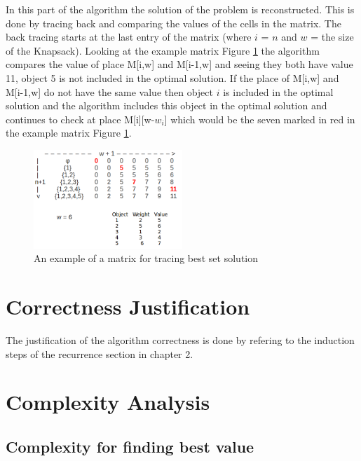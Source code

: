 \documentclass{inc/mas}
\begin{document}
In this part of the algorithm the solution of the problem is reconstructed. This is done by tracing back and comparing the values of the cells in the  matrix. The back tracing starts at the last entry of the matrix (where $i$ = $n$ and $w$ = the size of the Knapsack). Looking at the example matrix Figure \ref{marked_matrix} the algorithm compares the value of place M[i,w] and M[i-1,w] and seeing they both have value 11, object 5 is not included in the optimal solution. If the place of M[i,w] and M[i-1,w] do not have the same value then object $i$ is included in the optimal solution and the algorithm includes this object in the optimal solution and continues to check at place M[i][w-$w_i$] which would be the seven marked in red in the example matrix Figure \ref{marked_matrix}.\\



\begin{figure}[h!]
  \centering
      \includegraphics[width=0.5\textwidth]{marked_matrix.png}
  \caption{An example of a matrix for tracing best set solution }
  \label{marked_matrix}
\end{figure}


\section{Correctness Justification}
The justification of the algorithm correctness is done by refering to the induction steps of the recurrence section in chapter 2. \\

\section{Complexity Analysis}
\subsection{Complexity for finding best value}
\end{document}
